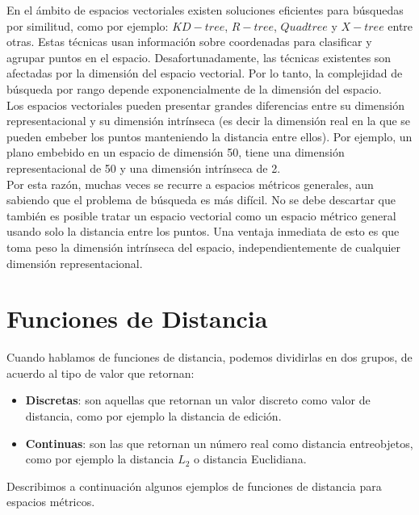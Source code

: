 En el \'ambito de espacios vectoriales existen soluciones eficientes para b\'usquedas por similitud, como por ejemplo: $KD-tree$, $R-tree$, $Quad tree$ y $X-tree$ entre otras. Estas t\'ecnicas usan informaci\'on sobre coordenadas para clasificar y agrupar puntos en el espacio. Desafortunadamente, las t\'ecnicas existentes son afectadas por la dimensi\'on del espacio vectorial. Por lo tanto, la complejidad de b\'usqueda por rango depende exponencialmente de la dimensi\'on del espacio.\\
 
Los espacios vectoriales pueden presentar grandes diferencias entre su dimensi\'on representacional y su dimensi\'on intr\'inseca (es decir la dimensi\'on real en la que se pueden embeber los puntos manteniendo la distancia entre ellos). Por ejemplo, un plano embebido en un espacio de dimensi\'on 50, tiene una dimensi\'on representacional de 50 y una dimensi\'on intr\'inseca de 2.\\

Por esta raz\'on, muchas veces se recurre a espacios m\'etricos generales, aun sabiendo que el problema de b\'usqueda es m\'as dif\'icil. No se debe descartar que tambi\'en es posible tratar un espacio vectorial como un espacio m\'etrico general usando solo la distancia entre los puntos. Una ventaja inmediata de esto es que toma peso la dimensi\'on intr\'inseca del espacio, independientemente de cualquier dimensi\'on representacional.\\

\section{Funciones de Distancia}

Cuando hablamos de funciones de distancia, podemos dividirlas en dos grupos, de acuerdo al tipo de valor que retornan:\\

\begin{itemize}
\item \textbf{Discretas}: son  aquellas que retornan un valor discreto como valor de distancia, como por ejemplo la distancia de edici\'on.
\item \textbf{Continuas}: son las que retornan un n\'umero real como distancia entreobjetos, como por ejemplo la distancia $L_2$ o distancia Euclidiana.
\end{itemize}

Describimos a continuaci\'on algunos ejemplos de funciones de distancia para espacios m\'etricos. \\

